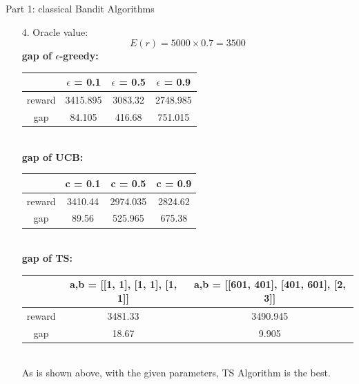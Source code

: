 \documentclass{article}
\begin{document}
\begin{homeworkProblem}{Part 1: classical Bandit Algorithms}
\begin{enumerate}
        \item[4.]
        Oracle value:$$E(r) = 5000\times0.7 = 3500$$
        \textbf{gap of $\epsilon$-greedy:}\\
        \begin{tabular}[t]{|c|c|c|c|}
        \hline
         & $\epsilon$ = 0.1 & $\epsilon$ = 0.5 & $\epsilon$ = 0.9 \\
        \hline
        reward & 3415.895 & 3083.32 & 2748.985 \\
        \hline
        gap & 84.105 & 416.68 & 751.015 \\
        \hline
        \end{tabular}\\

        \textbf{gap of UCB:}\\
        \begin{tabular}[t]{|c|c|c|c|}
        \hline
         & c = 0.1 & c = 0.5 & c = 0.9 \\
        \hline
        reward & 3410.44 & 2974.035 & 2824.62 \\
        \hline
        gap & 89.56 & 525.965 & 675.38 \\
        \hline
        \end{tabular}\\

        \textbf{gap of TS:}\\
        \begin{tabular}[t]{|c|c|c|}
        \hline
         & a,b = [[1, 1], [1, 1], [1, 1]] & a,b = [[601, 401], [401, 601], [2, 3]]\\
        \hline
        reward & 3481.33 & 3490.945 \\
        \hline
        gap & 18.67 & 9.905 \\
        \hline
        \end{tabular}\\

        As is shown above, with the given parameters, TS Algorithm is the best.\\
        

\end{enumerate}
\end{homeworkProblem}
\end{document}
